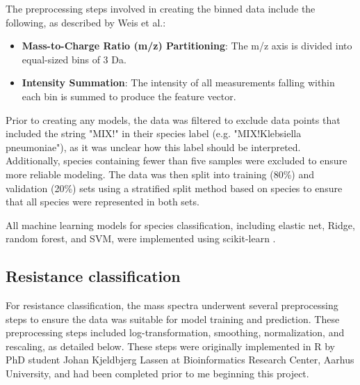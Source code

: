 \documentclass[english,11pt,a4paper,titlepage]{article}
\begin{document}
	The preprocessing steps involved in creating the binned data include the following, as described by Weis et al.:
	
	\begin{itemize}
		\item \textbf{Mass-to-Charge Ratio (m/z) Partitioning}: The m/z axis is divided into equal-sized bins of 3 Da.
		\item \textbf{Intensity Summation}: The intensity of all measurements falling within each bin is summed to produce the feature vector.
	\end{itemize}
	
	Prior to creating any models, the data was filtered to exclude data points that included the string "MIX!" in their species label (e.g. "MIX!Klebsiella pneumoniae"), as it was unclear how this label should be interpreted. Additionally, species containing fewer than five samples were excluded to ensure more reliable modeling. The data was then split into training (80\%) and validation (20\%) sets using a stratified split method based on species to ensure that all species were represented in both sets.
	
	All machine learning models for species classification, including elastic net, Ridge, random forest, and SVM, were implemented using scikit-learn \cite{scikit-learn}.
	
	\subsection*{Resistance classification}
	For resistance classification, the mass spectra underwent several preprocessing steps to ensure the data was suitable for model training and prediction. These preprocessing steps included log-transformation, smoothing, normalization, and rescaling, as detailed below. These steps were originally implemented in R by PhD student Johan Kjeldbjerg Lassen at Bioinformatics Research Center, Aarhus University, and had been completed prior to me beginning this project.
	
\end{document}
